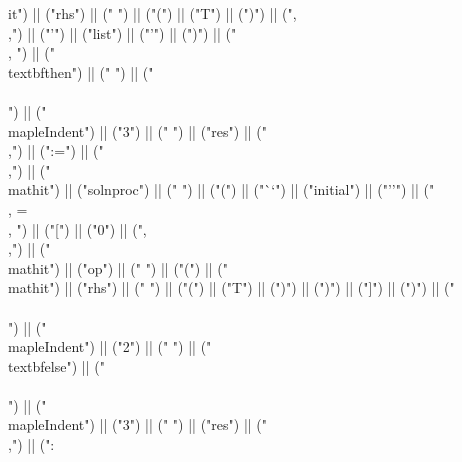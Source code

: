 \documentclass{article}
\begin{document}
\begin{center}
\begin{maplelatex}
{it{") || ("rhs") || ("} ") || ("(") || ("T") || (")") || (",\\,") || ("'") || ("list") || ("'") || (")") || (" \\, ") || ("\\textbf{then}") || (" ") || ("\\\\\n") || ("\\mapleIndent{") || ("3") || ("} ") || ("res") || ("\\,") || (":=") || ("\\,") || ("\\mathit{") || ("solnproc") || ("} ") || ("(") || ("``") || ("initial") || ("''") || (" \\, = \\, ") || ("[") || ("0") || (",\\,") || ("\\mathit{") || ("op") || ("} ") || ("(") || ("\\mathit{") || ("rhs") || ("} ") || ("(") || ("T") || (")") || (")") || ("]") || (")") || ("\\\\\n") || ("\\mapleIndent{") || ("2") || ("} ") || ("\\textbf{else}") || ("\\\\\n") || ("\\mapleIndent{") || ("3") || ("} ") || ("res") || ("\\,") || (":}
\end{maplelatex}
\end{center}
\end{document}
